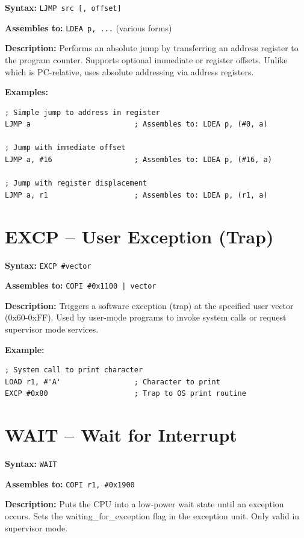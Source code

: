 \textbf{Syntax:} \texttt{LJMP src [, offset]}

\textbf{Assembles to:} \texttt{LDEA p, ...} (various forms)

\textbf{Description:} Performs an absolute jump by transferring an address register to the program counter. Supports optional immediate or register offsets. Unlike  which is PC-relative,  uses absolute addressing via address registers.

\textbf{Examples:}
\begin{lstlisting}
; Simple jump to address in register
LJMP a                        ; Assembles to: LDEA p, (#0, a)

; Jump with immediate offset
LJMP a, #16                   ; Assembles to: LDEA p, (#16, a)

; Jump with register displacement
LJMP a, r1                    ; Assembles to: LDEA p, (r1, a)
\end{lstlisting}

\section{EXCP -- User Exception (Trap)}

\textbf{Syntax:} \texttt{EXCP \#vector}

\textbf{Assembles to:} \texttt{COPI \#0x1100 | vector}

\textbf{Description:} Triggers a software exception (trap) at the specified user vector (0x60-0xFF). Used by user-mode programs to invoke system calls or request supervisor mode services.

\textbf{Example:}
\begin{lstlisting}
; System call to print character
LOAD r1, #'A'                 ; Character to print
EXCP #0x80                    ; Trap to OS print routine
\end{lstlisting}

\section{WAIT -- Wait for Interrupt}

\textbf{Syntax:} \texttt{WAIT}

\textbf{Assembles to:} \texttt{COPI r1, \#0x1900}

\textbf{Description:} Puts the CPU into a low-power wait state until an exception occurs. Sets the waiting\_for\_exception flag in the exception unit. Only valid in supervisor mode.

